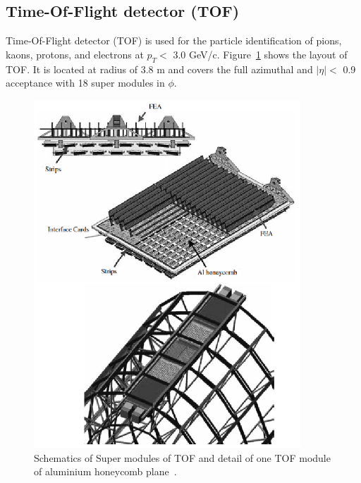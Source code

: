 \subsection{Time-Of-Flight detector (TOF)}
Time-Of-Flight detector (TOF) is used for the particle identification of pions, kaons, protons, and electrons at $p_{T} <$ 3.0 GeV/c.
Figure~\ref{fig_3_toflayout} shows the layout of TOF. 
It is located at radius of 3.8 m and covers the full azimuthal and $|\eta| < $ 0.9 acceptance with 18 super modules in $\phi$. 
\begin{figure}[!h]
    \begin{center}
      \includegraphics[width=10cm]{chap3/figure/TOF/SuperModule_TOF.eps}
    \end{center}
    \caption{Schematics of Super modules of TOF and detail of one TOF module of aluminium honeycomb plane~\cite{bib_toftdr}.}
    \label{fig_3_toflayout}
\end{figure}

